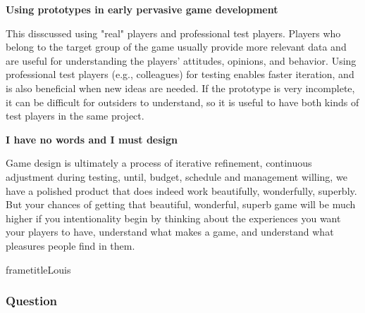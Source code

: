 \documentclass{beamer}
\begin{document}
	\begin{frame}
	\textbf{Using prototypes in early pervasive game development}
	
	This disscussed using "real" players and professional test players.
	Players who belong to the target group of the game usually provide more relevant data and are useful for understanding the players’ attitudes, opinions, and behavior. 
	Using professional test players (e.g., colleagues) for testing enables faster iteration, and is also beneficial when new ideas are needed. If the prototype is very incomplete, it can be difficult for outsiders to understand, so it is useful to have both kinds of test players in the same project.
	\end{frame}
	\begin{frame}
	\textbf{I have no words and I must design}
	
	Game design is ultimately a process of iterative refinement, continuous adjustment during testing, until, budget, schedule and management willing, we have a polished product that does indeed work beautifully, wonderfully, superbly.\\
	But your chances of getting that beautiful, wonderful, superb game will be much higher if you intentionality begin by thinking about the experiences you want your players to have, understand what makes a game, and understand what pleasures people find in them.
	\end{frame}





\begin{frame}
	frametitle{Louis}
\end{frame}

\begin{frame}
	\frametitle{Question}
	\tableofcontents
\end{frame}
\end{document}
